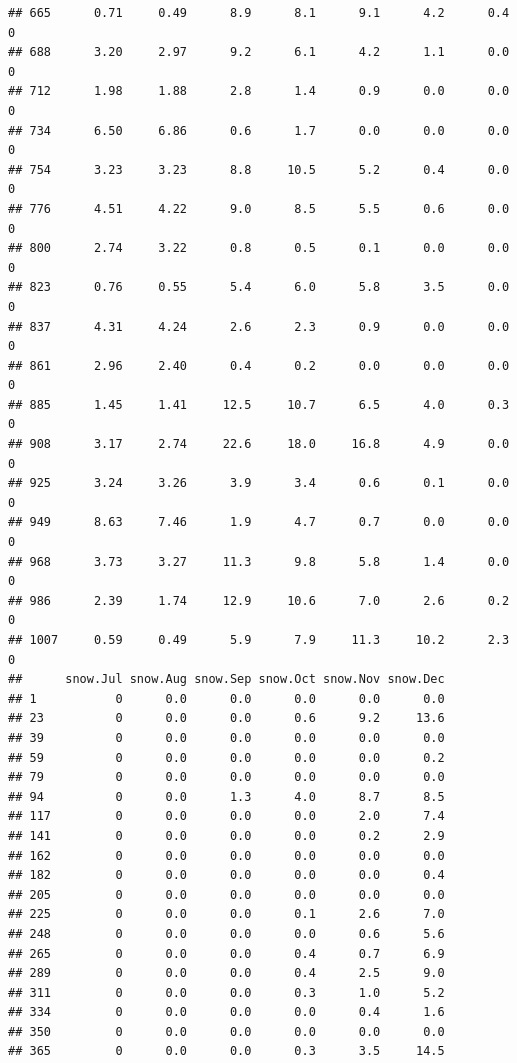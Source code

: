 \documentclass[
]{article}
\begin{document}
\begin{verbatim}
## 665      0.71     0.49      8.9      8.1      9.1      4.2      0.4        0
## 688      3.20     2.97      9.2      6.1      4.2      1.1      0.0        0
## 712      1.98     1.88      2.8      1.4      0.9      0.0      0.0        0
## 734      6.50     6.86      0.6      1.7      0.0      0.0      0.0        0
## 754      3.23     3.23      8.8     10.5      5.2      0.4      0.0        0
## 776      4.51     4.22      9.0      8.5      5.5      0.6      0.0        0
## 800      2.74     3.22      0.8      0.5      0.1      0.0      0.0        0
## 823      0.76     0.55      5.4      6.0      5.8      3.5      0.0        0
## 837      4.31     4.24      2.6      2.3      0.9      0.0      0.0        0
## 861      2.96     2.40      0.4      0.2      0.0      0.0      0.0        0
## 885      1.45     1.41     12.5     10.7      6.5      4.0      0.3        0
## 908      3.17     2.74     22.6     18.0     16.8      4.9      0.0        0
## 925      3.24     3.26      3.9      3.4      0.6      0.1      0.0        0
## 949      8.63     7.46      1.9      4.7      0.7      0.0      0.0        0
## 968      3.73     3.27     11.3      9.8      5.8      1.4      0.0        0
## 986      2.39     1.74     12.9     10.6      7.0      2.6      0.2        0
## 1007     0.59     0.49      5.9      7.9     11.3     10.2      2.3        0
##      snow.Jul snow.Aug snow.Sep snow.Oct snow.Nov snow.Dec
## 1           0      0.0      0.0      0.0      0.0      0.0
## 23          0      0.0      0.0      0.6      9.2     13.6
## 39          0      0.0      0.0      0.0      0.0      0.0
## 59          0      0.0      0.0      0.0      0.0      0.2
## 79          0      0.0      0.0      0.0      0.0      0.0
## 94          0      0.0      1.3      4.0      8.7      8.5
## 117         0      0.0      0.0      0.0      2.0      7.4
## 141         0      0.0      0.0      0.0      0.2      2.9
## 162         0      0.0      0.0      0.0      0.0      0.0
## 182         0      0.0      0.0      0.0      0.0      0.4
## 205         0      0.0      0.0      0.0      0.0      0.0
## 225         0      0.0      0.0      0.1      2.6      7.0
## 248         0      0.0      0.0      0.0      0.6      5.6
## 265         0      0.0      0.0      0.4      0.7      6.9
## 289         0      0.0      0.0      0.4      2.5      9.0
## 311         0      0.0      0.0      0.3      1.0      5.2
## 334         0      0.0      0.0      0.0      0.4      1.6
## 350         0      0.0      0.0      0.0      0.0      0.0
## 365         0      0.0      0.0      0.3      3.5     14.5

\end{verbatim}
\end{document}
